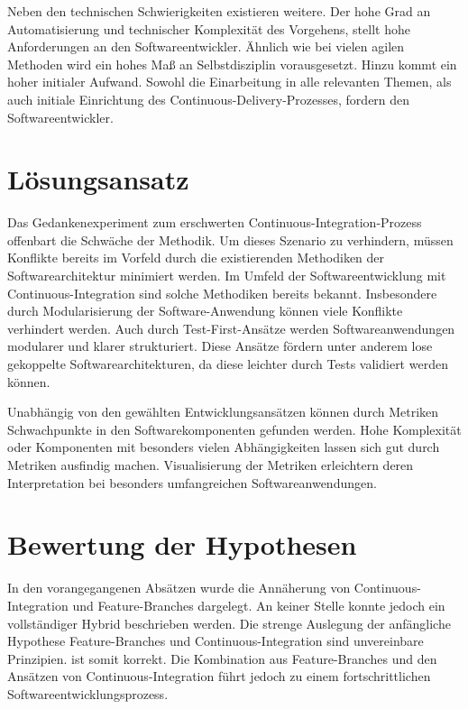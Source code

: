 Neben den technischen Schwierigkeiten existieren weitere. Der hohe Grad an Automatisierung und technischer Komplexität des Vorgehens, stellt hohe Anforderungen an den Softwareentwickler. Ähnlich wie bei vielen agilen Methoden wird ein hohes Maß an Selbstdisziplin vorausgesetzt. Hinzu kommt ein hoher initialer Aufwand. Sowohl die Einarbeitung in alle relevanten Themen, als auch initiale Einrichtung des Continuous-Delivery-Prozesses, fordern den Softwareentwickler.

\section{Lösungsansatz}

Das Gedankenexperiment zum erschwerten Continuous-Integration-Prozess offenbart die Schwäche der Methodik. Um dieses Szenario zu verhindern, müssen Konflikte bereits im Vorfeld durch die existierenden Methodiken der Softwarearchitektur minimiert werden. Im Umfeld der Softwareentwicklung mit Continuous-Integration sind solche Methodiken bereits bekannt. Insbesondere durch Modularisierung der Software-Anwendung können viele Konflikte verhindert werden. Auch durch Test-First-Ansätze werden Softwareanwendungen modularer und klarer strukturiert. Diese Ansätze fördern unter anderem \glqq lose gekoppelte\grqq{}  Softwarearchitekturen, da diese leichter durch Tests validiert werden können. 

Unabhängig von den gewählten Entwicklungsansätzen können durch Metriken\\ Schwachpunkte in den Softwarekomponenten gefunden werden. Hohe Komplexität oder Komponenten mit besonders vielen Abhängigkeiten lassen sich gut durch Metriken ausfindig machen. Visualisierung der Metriken erleichtern deren Interpretation bei besonders umfangreichen Softwareanwendungen. 

\section{Bewertung der Hypothesen}

In den vorangegangenen Absätzen wurde die Annäherung von Continuous-Integration und Feature-Branches dargelegt. An keiner Stelle konnte jedoch ein vollständiger Hybrid beschrieben werden. Die strenge Auslegung der anfängliche Hypothese \glqq Feature-Branches und Continuous-Integration sind unvereinbare Prinzipien.\grqq{} ist somit korrekt. Die Kombination aus Feature-Branches und den Ansätzen von Continuous-Integration führt jedoch zu einem fortschrittlichen Softwareentwicklungsprozess.


